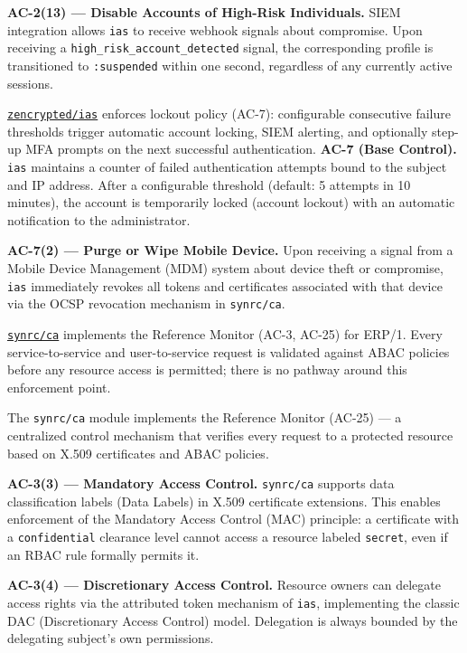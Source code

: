 \documentclass{article}
\begin{document}
\textbf{AC-2(13) --- Disable Accounts of High-Risk Individuals.}
SIEM integration allows \texttt{ias} to receive webhook signals about compromise. Upon receiving a \texttt{high\_risk\_account\_detected} signal, the corresponding profile is transitioned to \texttt{:suspended} within one second, regardless of any currently active sessions.

\href{https://github.com/zencrypted/ias}{\texttt{zencrypted/ias}} enforces lockout policy (AC-7): configurable consecutive failure thresholds trigger automatic account locking, SIEM alerting, and optionally step-up MFA prompts on the next successful authentication.
\textbf{AC-7 (Base Control).}
\texttt{ias} maintains a counter of failed authentication attempts bound to the subject and IP address. After a configurable threshold (default: 5 attempts in 10 minutes), the account is temporarily locked (account lockout) with an automatic notification to the administrator.

\textbf{AC-7(2) --- Purge or Wipe Mobile Device.}
Upon receiving a signal from a Mobile Device Management (MDM) system about device theft or compromise, \texttt{ias} immediately revokes all tokens and certificates associated with that device via the OCSP revocation mechanism in \texttt{synrc/ca}.

\href{https://github.com/synrc/ca}{\texttt{synrc/ca}} implements the Reference Monitor (AC-3, AC-25) for ERP/1. Every service-to-service and user-to-service request is validated against ABAC policies before any resource access is permitted; there is no pathway around this enforcement point.

The \texttt{synrc/ca} module implements the Reference Monitor (AC-25) --- a centralized control mechanism that verifies every request to a protected resource based on X.509 certificates and ABAC policies.

\textbf{AC-3(3) --- Mandatory Access Control.}
\texttt{synrc/ca} supports data classification labels (Data Labels) in X.509 certificate extensions. This enables enforcement of the Mandatory Access Control (MAC) principle: a certificate with a \texttt{confidential} clearance level cannot access a resource labeled \texttt{secret}, even if an RBAC rule formally permits it.

\textbf{AC-3(4) --- Discretionary Access Control.}
Resource owners can delegate access rights via the attributed token mechanism of \texttt{ias}, implementing the classic DAC (Discretionary Access Control) model. Delegation is always bounded by the delegating subject's own permissions.
\end{document}
